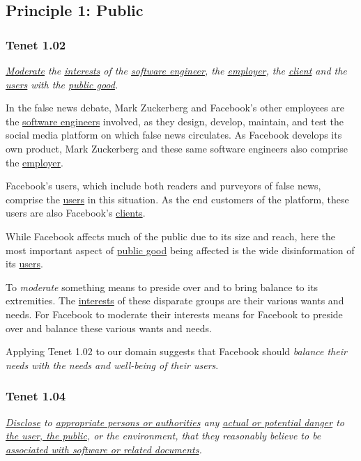 

\subsection{Principle 1: Public}

\subsubsection{Tenet 1.02}
\emph{\ul{Moderate} the \ul{interests} of the \ul{software engineer}, the \ul{employer}, the \ul{client} and the \ul{users} with the \ul{public good}. \cite{se_code}}

\tenetmargin

\par In the false news debate, Mark Zuckerberg and Facebook's other employees are the \ul{software engineers} involved, as they design, develop, maintain, and test the social media platform on which false news circulates. As Facebook develops its own product, Mark Zuckerberg and these same software engineers also comprise the \ul{employer}. 

\par Facebook's users, which include both readers and purveyors of false news, comprise the \ul{users} in this situation. As the end customers of the platform, these users are also Facebook's \ul{clients}.

\par While Facebook affects much of the public due to its size and reach, here the most important aspect of \ul{public good} being affected is the wide disinformation of its \ul{users}.

\par To \emph{moderate} something means to preside over and to bring balance to its extremities. \cite{dictionary} The \ul{interests} of these disparate groups are their various wants and needs. For Facebook to moderate their interests means for Facebook to preside over and balance these various wants and needs. 


Applying Tenet 1.02 to our domain suggests that Facebook should \emph{balance their needs with the needs and well-being of their users}.

\subsubsection{Tenet 1.04}
\emph{\ul{Disclose} to \ul{appropriate persons or authorities} any \ul{actual or potential danger} to \ul{the user, the public}, or the environment, that they reasonably believe to be \ul{associated with software or related documents}. \cite{se_code}}

